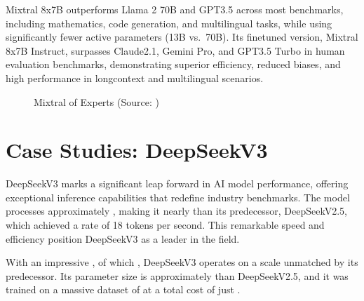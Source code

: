 \documentclass[letterpaper,11pt,english]{sphinxmanual}
\begin{document}
\sphinxAtStartPar
Mixtral 8x7B outperforms Llama 2 70B and GPT\sphinxhyphen{}3.5 across most benchmarks,
including mathematics, code generation, and multilingual tasks, while
using significantly fewer active parameters (13B vs. 70B). Its
fine\sphinxhyphen{}tuned version, Mixtral 8x7B \textendash{} Instruct, surpasses Claude\sphinxhyphen{}2.1,
Gemini Pro, and GPT\sphinxhyphen{}3.5 Turbo in human evaluation benchmarks,
demonstrating superior efficiency, reduced biases, and high performance
in long\sphinxhyphen{}context and multilingual scenarios.

\begin{figure}[htbp]
\centering
\capstart

\noindent{}
\caption{Mixtral of Experts (Source: )}\label{\detokenize{pretraining:id28}}\end{figure}


\section{Case Studies: DeepSeek\sphinxhyphen{}V3}
\label{\detokenize{pretraining:case-studies-deepseek-v3}}
\sphinxAtStartPar
DeepSeek\sphinxhyphen{}V3 marks a significant leap
forward in AI model performance, offering exceptional inference
capabilities that redefine industry benchmarks. The model processes
approximately , making it nearly  than its predecessor, DeepSeek\sphinxhyphen{}V2.5, which achieved a rate of
18 tokens per second. This remarkable speed and efficiency position
DeepSeek\sphinxhyphen{}V3 as a leader in the field.

\sphinxAtStartPar
With an impressive ,
of which , DeepSeek\sphinxhyphen{}V3 operates on
a scale unmatched by its predecessor. Its parameter size is
approximately  than DeepSeek\sphinxhyphen{}V2.5, and it was
trained on a massive dataset of  at
a total cost of just .
\end{document}
